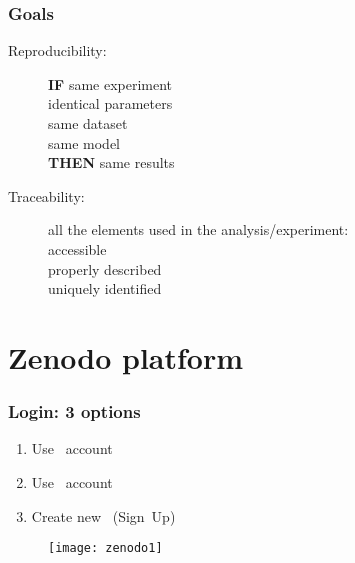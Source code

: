 \begin{frame}[c]
\frametitle{Goals}

\begin{description}
\item[Reproducibility:] \textbf{IF} same experiment \\
identical parameters\\
same dataset\\
same model\\
\textbf{THEN} same results
\item[Traceability:] all the elements used in the analysis/experiment: \\
accessible\\
properly described\\
uniquely identified
\end{description}

\end{frame}

\section{Zenodo platform}

\begin{frame}


\end{frame}


\begin{frame}[c]
\frametitle{Login: 3 options}

\begin{enumerate}
\item Use \faGithub~account
\item Use \aiOrcid~account
\item Create new \faUser~(Sign~Up)
\end{enumerate}

\begin{figure}
\centering
\texttt{[image: zenodo1]}
\end{figure}

\end{frame}

